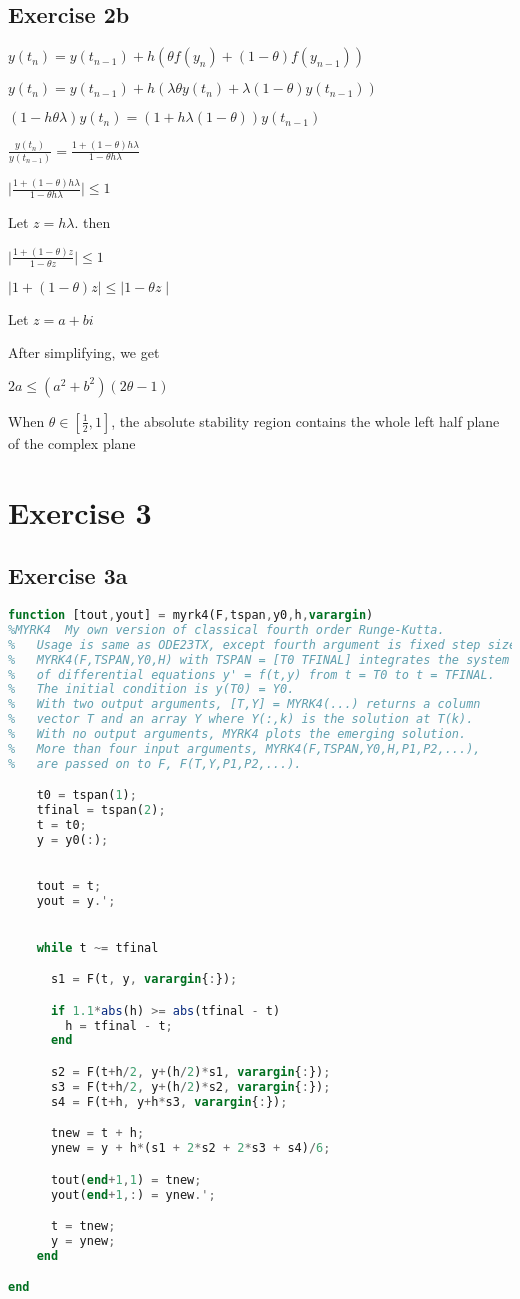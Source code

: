 \documentclass[11pt]{article} %
\begin{document}
\subsection{Exercise 2b}
\centerline{$y(t_{n})=y(t_{n-1})+h(\theta f(y_{n})+(1-\theta)f(y_{n-1}))$}
\centerline{$y(t_{n})=y(t_{n-1})+h(\lambda \theta y(t_{n})+\lambda (1-\theta) y(t_{n-1}))$}
\centerline{$(1-h\theta\lambda)y(t_{n}) = (1+h\lambda (1-\theta))y(t_{n-1})$}
\centerline{$\frac{y(t_{n})}{y(t_{n-1})}=\frac{1+(1-\theta) h\lambda }{1-\theta h\lambda}$}
\centerline{$\mid \frac{1+(1-\theta) h\lambda }{1-\theta h\lambda} \mid \leq 1$}
Let $z =  h\lambda$. then\\
\centerline{$\mid \frac{1+(1-\theta) z }{1-\theta z} \mid \leq 1$}
\centerline{$\mid 1+(1-\theta)z \mid \leq \mid 1-\theta z \mid$}
\centerline{Let $z = a+bi$}
After simplifying, we get\\
\centerline{$2a\leq (a^2+b^2)(2\theta -1)$}
When $\theta \in [\frac{1}{2},1]$, the absolute stability region contains the whole left half plane of the complex plane
\section{Exercise 3}
\subsection{Exercise 3a}
\begin{lstlisting}[language=Octave]
function [tout,yout] = myrk4(F,tspan,y0,h,varargin)
%MYRK4  My own version of classical fourth order Runge-Kutta.
%   Usage is same as ODE23TX, except fourth argument is fixed step size, h.
%   MYRK4(F,TSPAN,Y0,H) with TSPAN = [T0 TFINAL] integrates the system
%   of differential equations y' = f(t,y) from t = T0 to t = TFINAL.
%   The initial condition is y(T0) = Y0.
%   With two output arguments, [T,Y] = MYRK4(...) returns a column 
%   vector T and an array Y where Y(:,k) is the solution at T(k).
%   With no output arguments, MYRK4 plots the emerging solution.
%   More than four input arguments, MYRK4(F,TSPAN,Y0,H,P1,P2,...),
%   are passed on to F, F(T,Y,P1,P2,...).

    t0 = tspan(1);
    tfinal = tspan(2);
    t = t0;
    y = y0(:);

  
    tout = t;
    yout = y.';
    

    while t ~= tfinal

      s1 = F(t, y, varargin{:});

      if 1.1*abs(h) >= abs(tfinal - t)
        h = tfinal - t;
      end

      s2 = F(t+h/2, y+(h/2)*s1, varargin{:});
      s3 = F(t+h/2, y+(h/2)*s2, varargin{:});
      s4 = F(t+h, y+h*s3, varargin{:});

      tnew = t + h;
      ynew = y + h*(s1 + 2*s2 + 2*s3 + s4)/6;

      tout(end+1,1) = tnew; 
      yout(end+1,:) = ynew.';

      t = tnew;
      y = ynew;
    end

end
\end{lstlisting}
\end{document}
